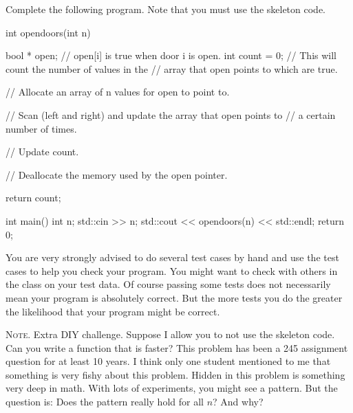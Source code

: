 Complete the following program.
Note that you must use the skeleton code.
\begin{console}
int opendoors(int n)
{
    bool * open;   // open[i] is true when door i is open.
    int count = 0; // This will count the number of values in the
                   // array that open points to which are true.

    // Allocate an array of n values for open to point to.
    
    // Scan (left and right) and update the array that open points to
    // a certain number of times.
    
    // Update count.

    // Deallocate the memory used by the open pointer.

    return count;
}


int main()
{
    int n;
    std::cin >> n;
    std::cout << opendoors(n) << std::endl;
    return 0;
}
\end{console}

You are very strongly
advised to do several test cases by hand and use the test cases
to help you check your program.
You might want to check with others in the class on your test data.
Of course passing some tests does not necessarily mean your program is
absolutely correct.
But the more tests you do the greater the likelihood that your
program might be correct.

\textsc{Note.}
Extra DIY challenge.
Suppose I allow you to not use the skeleton code.
Can you write a function that is faster?
This problem has been a 245 assignment question for at least
10 years.
I think only one student mentioned to me that something
is very fishy about this problem.
Hidden in this problem is something very deep in math.
With lots of experiments, you might see a pattern.
But the question is: Does the pattern really hold for all $n$? And why?
